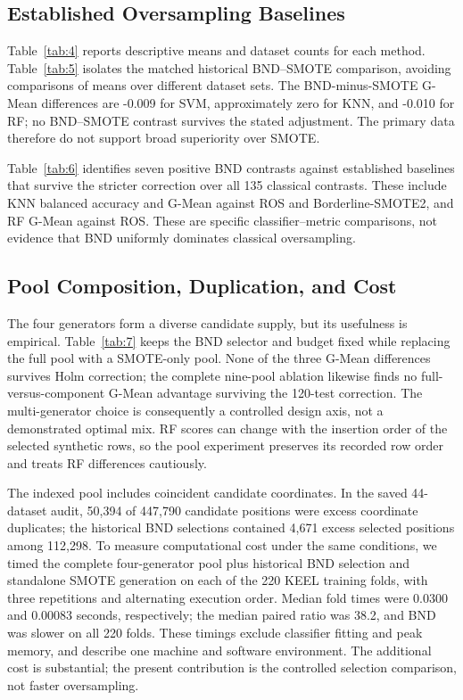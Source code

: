 \documentclass[pdflatex]{sn-jnl}
\begin{document}


\subsection{Established Oversampling Baselines}

Table~\ref{tab:4} reports descriptive means and dataset counts for each method. Table~\ref{tab:5} isolates the matched historical BND--SMOTE comparison, avoiding comparisons of means over different dataset sets. The BND-minus-SMOTE G-Mean differences are -0.009 for SVM, approximately zero for KNN, and -0.010 for RF; no BND--SMOTE contrast survives the stated adjustment. The primary data therefore do not support broad superiority over SMOTE.




Table~\ref{tab:6} identifies seven positive BND contrasts against established baselines that survive the stricter correction over all 135 classical contrasts. These include KNN balanced accuracy and G-Mean against ROS and Borderline-SMOTE2, and RF G-Mean against ROS. These are specific classifier--metric comparisons, not evidence that BND uniformly dominates classical oversampling.



\subsection{Pool Composition, Duplication, and Cost}

The four generators form a diverse candidate supply, but its usefulness is empirical. Table~\ref{tab:7} keeps the BND selector and budget fixed while replacing the full pool with a SMOTE-only pool. None of the three G-Mean differences survives Holm correction; the complete nine-pool ablation likewise finds no full-versus-component G-Mean advantage surviving the 120-test correction. The multi-generator choice is consequently a controlled design axis, not a demonstrated optimal mix. RF scores can change with the insertion order of the selected synthetic rows, so the pool experiment preserves its recorded row order and treats RF differences cautiously.



The indexed pool includes coincident candidate coordinates. In the saved 44-dataset audit, 50,394 of 447,790 candidate positions were excess coordinate duplicates; the historical BND selections contained 4,671 excess selected positions among 112,298. To measure computational cost under the same conditions, we timed the complete four-generator pool plus historical BND selection and standalone SMOTE generation on each of the 220 KEEL training folds, with three repetitions and alternating execution order. Median fold times were 0.0300 and 0.00083 seconds, respectively; the median paired ratio was 38.2, and BND was slower on all 220 folds. These timings exclude classifier fitting and peak memory, and describe one machine and software environment. The additional cost is substantial; the present contribution is the controlled selection comparison, not faster oversampling.
\end{document}
